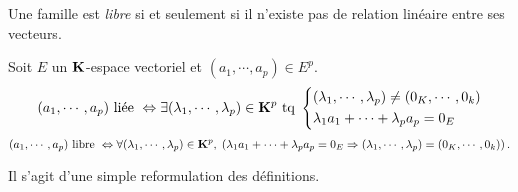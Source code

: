 \begin{defi}
  Une famille est \emph{libre} si et seulement si il n'existe pas de relation linéaire entre ses vecteurs. 
\end{defi}

\begin{prop}
Soit $E$ un $\mathbf{K}$-espace vectoriel et $(a_1, \cdots,a_p)\in E^p$.
\[
  (a_1, \cdots,a_p) \text{ liée } \Leftrightarrow \exists (\lambda_1, \cdots, \lambda_p)\in \mathbf{K}^p \text{ tq }
\left\lbrace
\begin{aligned}
  &(\lambda_1, \cdots, \lambda_p) \neq (0_K, \cdots, 0_k)\\
  &\lambda_1 a_1 + \cdots + \lambda_p a_p = 0_E
\end{aligned}
\right.
\]
\[
  (a_1, \cdots,a_p) \text{ libre } \Leftrightarrow \forall (\lambda_1, \cdots, \lambda_p)\in \mathbf{K}^p, \;
\left( \lambda_1 a_1 + \cdots + \lambda_p a_p = 0_E \Rightarrow (\lambda_1, \cdots, \lambda_p) = (0_K, \cdots, 0_k)\right).
\]
\end{prop}
\begin{demo}
  Il s'agit d'une simple reformulation des définitions.
\end{demo}


